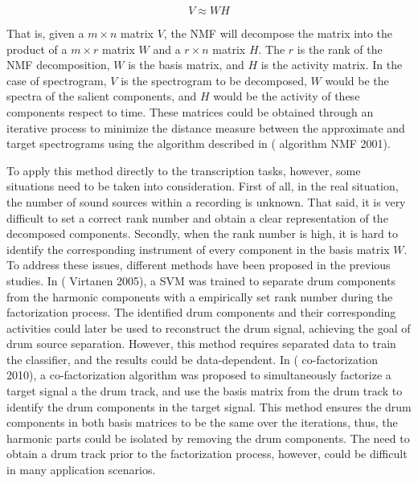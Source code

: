 \documentclass{article}
\begin{document}
\begin{equation}
V \approx WH
\label{eq:approx}
\end{equation}

That is, given a $m \times n$ matrix $V$, the NMF will decompose the matrix into the product of a $m \times r$ matrix $W$ and a $r \times n$ matrix $H$. The $r$ is the rank of the NMF decomposition, $W$ is the basis matrix, and $H$ is the activity matrix. In the case of spectrogram, $V$ is the spectrogram to be decomposed, $W$ would be the spectra of the salient components, and $H$ would be the activity of these components respect to time. These matrices could be obtained through an iterative process to minimize the distance measure between the approximate and target spectrograms using the algorithm described in (\cite{} algorithm NMF 2001). 

To apply this method directly to the transcription tasks, however, some situations need to be taken into consideration. First of all, in the real situation, the number of sound sources within a recording is unknown. That said, it is very difficult to set a correct rank number and obtain a clear representation of the decomposed  components. Secondly, when the rank number is high, it is hard to identify the corresponding instrument of every component in the basis matrix $W$. To address these issues, different methods have been proposed in the previous studies. In (\cite{} Virtanen 2005), a SVM was trained to separate drum components from the harmonic components with a empirically set rank number during the factorization process. The identified drum components and their corresponding activities could later be used to reconstruct the drum signal, achieving the goal of drum source separation. However, this method requires separated data to train the classifier, and the results could be data-dependent. In (\cite{} co-factorization 2010), a co-factorization algorithm was proposed to simultaneously factorize a target signal a the drum track, and use the basis matrix from the drum track to identify the drum components in the target signal. This method ensures the drum components in both basis matrices to be the same over the iterations, thus, the harmonic parts could be isolated by removing the drum components. The need to obtain a drum track prior to the factorization process, however, could be difficult in many application scenarios.
\end{document}
